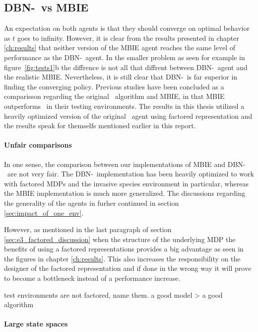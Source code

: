 \subsection{DBN-\etre\ vs MBIE }

An expectation on both agents is that they should converge on optimal behavior
as $t$ goes to infinity. However, it is clear from the results presented in
chapter \ref{ch:results} that neither version of the MBIE agent reaches the
same level of performance as the DBN-\etre\ agent. In the smaller problem as
seen for example in figure~\ref{fig:tests1}b the diffrence is not all that
diffrent between DBN-\etre\ agent and the realistic MBIE. Nevertheless, it is
still clear that DBN-\etre\ is far superior in finding the converging policy.
Previous studies have been concluded as a comparisson regarding the original
\etre\ algorithm and MBIE, in \textcite{strehl2004empirical} that MBIE
outperforms \etre\ in their testing environments. The results in this thesis
utilized a heavily optimized version of the original \etre\ agent using
factored representation and the results speak for themselfs mentioned earlier
in this report. 

\paragraph{Unfair comparisons}

In one sense, the comparison between our implementations of MBIE and DBN-\etre\
are not very fair. The DBN-\etre\ implementation has been heavily optimized to
work with factored MDPs and the invasive species environment in particular,
whereas the MBIE implementation is much more generalized. The discussions
regarding the generality of the agents in furher continued in section
\ref{sec:impact_of_one_env}. 

However, as mentioned in the last paragraph of
section \ref{sec:e3_factored_discussion} when the structure of the underlying
MDP the benefits of using a factored representations provides a big advantage
as seen in the figures in chapter \ref{ch:results}. This also increases the
responsibility on the designer of the factored representation and if done in
the wrong way it will prove to become a bottleneck instead of a performance
increase. 

test environments are not factored, name them.
a good model > a good algorithm

\paragraph{Large state spaces}

